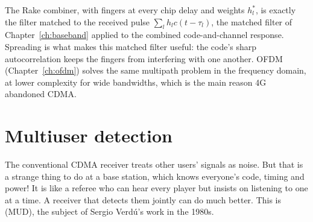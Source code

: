 \begin{keyidea}
The Rake combiner, with fingers at every chip delay and weights $h_l^*$, is exactly the filter
matched to the received pulse $\sum_lh_lc(t-\tau_l)$, the matched filter of
Chapter~\ref{ch:baseband} applied to the combined code-and-channel response. Spreading is what
makes this matched filter useful: the code's sharp autocorrelation keeps the fingers from
interfering with one another. OFDM (Chapter~\ref{ch:ofdm}) solves the same multipath problem
in the frequency domain, at lower complexity for wide bandwidths, which is the main reason
4G abandoned CDMA.
\end{keyidea}


\section{Multiuser detection}
\label{sec:ch18:mud}

The conventional CDMA receiver treats other users' signals as noise. But that is a strange thing
to do at a base station, which knows everyone's code, timing and power! It is like a referee who
can hear every player but insists on listening to one at a time. A receiver that detects them
jointly can do much better. This is  (MUD), the subject of Sergio
Verd\'u's work in the 1980s.

